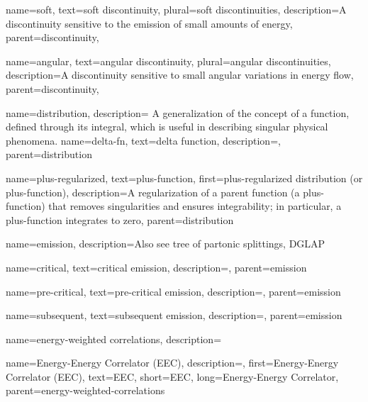     {
        name=soft,
        text=soft discontinuity,
        plural=soft discontinuities,
        description={A discontinuity sensitive to the emission of small amounts of energy},
        parent=discontinuity,
    }

    {
        name=angular,
        text={angular discontinuity},
        plural={angular discontinuities},
        description={A discontinuity sensitive to small angular variations in energy flow},
        parent=discontinuity,
    }

{
    name=distribution,
    description={
        A generalization of the concept of a function, defined through its integral, which is useful in describing singular physical phenomena.
    }
}
    {
      name=delta-fn,
      text=delta function,
      description={},
      parent=distribution
    }

    {
      name=plus-regularized,
      text=plus-function,
      first=plus-regularized distribution (or plus-function),
      description={A regularization of a parent function (a plus-function) that removes singularities and ensures integrability;
      in particular, a plus-function integrates to zero},
      parent=distribution
    }



{
    name=emission,
    description={Also see tree of partonic splittings, DGLAP}
}

    {
        name=critical,
        text=critical emission,
        description={},
        parent=emission
    }

    {
        name=pre-critical,
        text=pre-critical emission,
        description={},
        parent=emission
    }

    {
        name=subsequent,
        text=subsequent emission,
        description={},
        parent=emission
    }



{
    name=energy-weighted correlations,
    description={}
}


    {
        name=Energy-Energy Correlator (EEC),
        description={},
        first={Energy-Energy Correlator (EEC)},
        text={EEC},
        short={EEC},
        long={Energy-Energy Correlator},
        parent=energy-weighted-correlations
    }


